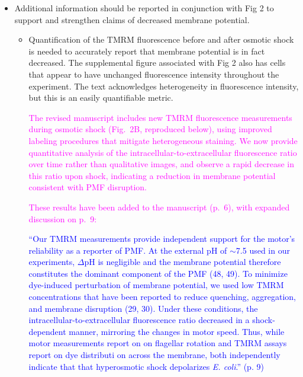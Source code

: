 \documentclass[11pt, letterpaper]{article}%
\newcommand{\revised}{\textcolor{blue}}
\newcommand{\response}{\textcolor{magenta}}
\begin{document}
\begin{itemize}
\item Additional information should be reported in conjunction with Fig 2 to support and strengthen claims of decreased membrane potential.
\begin{itemize}

\item Quantification of the TMRM fluorescence before and after osmotic shock is needed to accurately report that membrane potential is in fact decreased. The supplemental figure associated with Fig 2 also has cells that appear to have unchanged fluorescence intensity throughout the experiment. The text acknowledges heterogeneity in fluorescence intensity, but this is an easily quantifiable metric.

    
\response{The revised manuscript includes new TMRM fluorescence measurements during osmotic shock (Fig.~2B, reproduced below), using improved labeling procedures that mitigate heterogeneous staining. We now provide quantitative analysis of the intracellular-to-extracellular fluorescence ratio over time rather than qualitative images, and observe a rapid decrease in this ratio upon shock, indicating a reduction in membrane potential consistent with PMF disruption.}

\response{These results have been added to the manuscript (p.~6), with expanded discussion on p.~9:}

\begin{mdframed}
\footnotesize\revised{``Our TMRM measurements provide independent support for the motor’s reliability as a reporter of PMF. At the external pH of $\sim$7.5 used in our experiments, $\Delta \text{pH}$ is negligible and the membrane potential therefore constitutes the dominant component of the PMF (48, 49). To minimize dye-induced perturbation of membrane potential, we used low TMRM concentrations that have been reported to reduce quenching, aggregation, and membrane disruption (29, 30). Under these conditions, the intracellular-to-extracellular fluorescence ratio decreased in a shock-dependent manner, mirroring the changes in motor speed. Thus, while motor measurements report on on flagellar rotation and TMRM assays report on dye distributi   on across the membrane, both independently indicate that that hyperosmotic shock depolarizes \textit{E. coli}.'' (p. 9)}
\end{mdframed}


\end{itemize}
\end{itemize}
\end{document}
